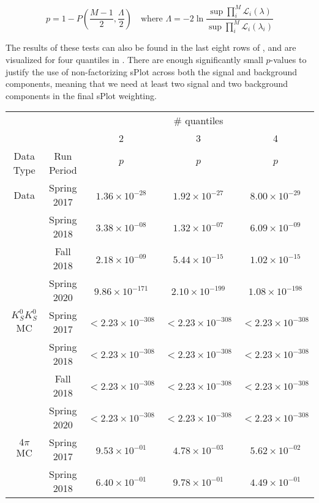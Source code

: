 \begin{equation}
  p = 1 - P\left(\frac{M-1}{2}, \frac{\Lambda}{2}\right) \quad\text{where }\Lambda = -2\ln\frac{\sup\prod_i^M \mathcal{L}_i(\lambda)}{\sup\prod_i^M \mathcal{L}_i(\lambda_i)}
  \label{eq:independence-test-mc}
\end{equation}

The results of these tests can also be found in the last eight rows of , and are visualized for four quantiles in . There are enough significantly small $p$-values to justify the use of non-factorizing sPlot across both the signal and background components, meaning that we need at least two signal and two background components in the final sPlot weighting.

\begin{table}
  \begin{center}
    \begin{tabular}{ccccc}\toprule
       & & \multicolumn{3}{c}{\# quantiles} \\\cmidrule(lr){3-5}
       & & 2 & 3 & 4 \\
       Data Type & Run Period & $p$ & $p$ & $p$ \\\midrule
      Data & Spring 2017 & $1.36 \times 10^{-28}$ & $1.92 \times 10^{-27}$ & $8.00 \times 10^{-29}$\\
       & Spring 2018 & $3.38 \times 10^{-08}$ & $1.32 \times 10^{-07}$ & $6.09 \times 10^{-09}$\\
       & Fall 2018 & $2.18 \times 10^{-09}$ & $5.44 \times 10^{-15}$ & $1.02 \times 10^{-15}$\\
       & Spring 2020 & $9.86 \times 10^{-171}$ & $2.10 \times 10^{-199}$ & $1.08 \times 10^{-198}$\\\midrule
      $K_S^0K_S^0$ MC & Spring 2017 & $<2.23\times 10^{-308}$ & $<2.23\times 10^{-308}$ & $<2.23\times 10^{-308}$\\
       & Spring 2018 & $<2.23\times 10^{-308}$ & $<2.23\times 10^{-308}$ & $<2.23\times 10^{-308}$\\
       & Fall 2018 & $<2.23\times 10^{-308}$ & $<2.23\times 10^{-308}$ & $<2.23\times 10^{-308}$\\
       & Spring 2020 & $<2.23\times 10^{-308}$ & $<2.23\times 10^{-308}$ & $<2.23\times 10^{-308}$\\\midrule
      $4\pi$ MC & Spring 2017 & $9.53 \times 10^{-01}$ & $4.78 \times 10^{-03}$ & $5.62 \times 10^{-02}$\\
       & Spring 2018 & $6.40 \times 10^{-01}$ & $9.78 \times 10^{-01}$ & $4.49 \times 10^{-01}$\\

\end{tabular}
\end{center}
\end{table}
